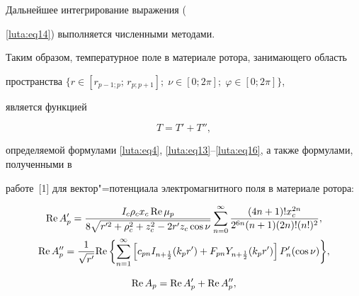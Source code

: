 {{{{{{{{\begin{equation}
\end{equation}

Дальнейшее интегрирование выражения ({\ref{luta:eq14}) выполняется численными методами.





Таким образом, температурное поле в материале ротора, занимающего область

пространства $\bigl\{ r\in [ r_{p-1; p};\, r_{p; p+1} ];\;

\nu \in [ 0; 2\pi];\; \varphi \in [0; 2\pi ] \bigr\}$,

является функцией

\begin{equation}

\label{luta:eq17}

T=T'+T'',

\end{equation}

определяемой формулами \eqref{luta:eq4}, \eqref{luta:eq13}--\eqref{luta:eq16}, а также формулами, полученными в

работе~[1] для вектор"=потенциала электромагнитного поля в материале ротора:

\begin{gather}

\label{luta:eq18}

{\rm Re\,}A_p' =

\frac{I_c  \rho _c x_c \,{\rm Re\,}\mu _p}{8\sqrt {r'^2+\rho _c^2 +z_c^2 -2r'z_c\cos \nu } }

\sum\limits_{n=0}^\infty

\frac{(4n+1)!x_c^{2n} }{2^{6n}(n+1)(2n)!(n!)^2} ,

\\

\label{luta:eq19}

{\rm Re\,}A''_p =\frac1{\sqrt {r'}}

{\rm Re\,}\biggl\{

\sum\limits_{n=1}^\infty

\left[ c_{pn} I_{n+\frac12} ( k_p r' )+F_{pn} Y_{n+\frac12}

(k_p r') \right] P_n' (\cos \nu )  \biggr\},

\end{gather}

\begin{equation}

\label{luta:eq20}

{\rm Re\,}A_p ={\rm Re\,}A_p' +{\rm Re\,}A_p'',


\end{equation}}}}}}}}}}

